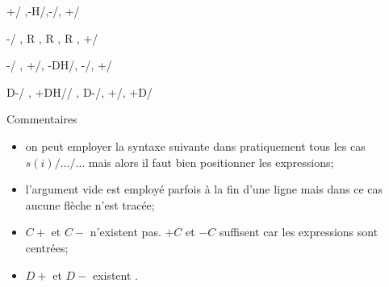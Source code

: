 \begin{minipage}{16cm}
\begin{tkzexample}
 {+/  \va  ,-H/\vb,-/\vc, +/  \vd}
\end{tkzexample}
\end{minipage}

\begin{minipage}{16cm}
\begin{tkzexample}
 {-/  \va  , R , R , R , +/  \ve}
\end{tkzexample}
\end{minipage}

\begin{minipage}{16cm}
\begin{tkzexample}
  {-/ \va , +/\vb , -DH/\vc , -/\vd , +/ \ve}
 \end{tkzexample}
\end{minipage}

\begin{minipage}{16cm}
\begin{tkzexample}
 {D-/ \va , +DH/\vb/ , D-/\vc , +/\vd , +D/\ve}
\end{tkzexample}
\end{minipage}
\egroup

\medskip
Commentaires
\begin{itemize}
  \item on peut employer la syntaxe suivante dans pratiquement tous les cas $s(i)/\ldots/\ldots$ mais alors il faut bien positionner les expressions;

  \item l'argument vide est employé parfois à la fin d'une ligne mais dans ce cas aucune flèche n'est tracée;

  \item $C+$ et $C-$ n'existent pas. $+C$ et $-C$ suffisent car les expressions sont centrées;
  \item  $D+$ et $D-$ existent .

\end{itemize}


